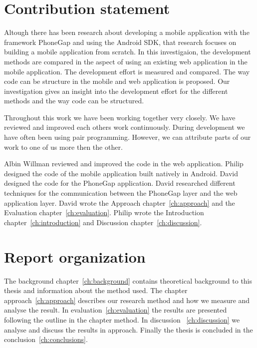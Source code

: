 \section{Contribution statement}\label{sec:contribution-statement}
Altough there has been research about developing a mobile application with the framework PhoneGap and using the Android SDK, that research focuses on building a mobile application from scratch. In this investigaion, the development methods are compared in the aspect of using an existing web application in the mobile application. The development effort is measured and compared. The way code can be structure in the mobile and web application is proposed. Our investigation gives an insight into the development effort for the different methods and the way code can be structured.

Throughout this work we have been working together very closely. We have reviewed and improved each others work continuously. During development we have often been using pair programming. However, we can attribute parts of our work to one of us more then the other.

Albin Willman reviewed and improved the code in the web application. Philip designed the code of the mobile application built natively in Android. David designed the code for the PhoneGap application. David researched different techniques for the communication between the PhoneGap layer and the web application layer. David wrote the Approach chapter~\ref{ch:approach} and the Evaluation chapter~\ref{ch:evaluation}. Philip wrote the Introduction chapter~\ref{ch:introduction} and Discussion chapter~\ref{ch:discussion}.

\section{Report organization}\label{sec:report-organization}
The background chapter~\ref{ch:background} contains theoretical background to this thesis and information about the method used. The chapter approach~\ref{ch:approach} describes our research method and how we measure and analyse the result. In evaluation~\ref{ch:evaluation} the results are presented following the outline in the chapter method. In discussion ~\ref{ch:discussion} we analyse and discuss the results in approach. Finally the thesis is concluded in the conclusion~\ref{ch:conclusions}.
